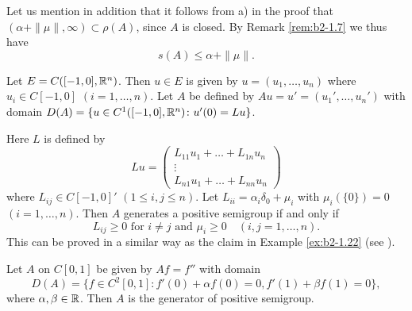 Let us mention in addition that it follows from a) in the proof that $(\alpha + \|\mu\|, \infty) \subset \rho(A)$, since $A$ is closed.
By Remark \ref{rem:b2-1.7} we thus have
\begin{equation}\label{eq:b2-1.14}
s(A) \leq \alpha + \|\mu\|.
\end{equation}
\begin{example}\label{ex:b2-1.23}
Let $E = C([-1,0],\mathbb{R}^{n})$.
Then $u \in E$ is given by $u = (u_{1},\ldots,u_{n})$ where $u_{i} \in C[-1,0]$ $(i=1,\ldots,n)$.
Let $A$ be defined by $Au = u' = (u_{1}',\ldots,u_{n}')$ with domain $D(A) = \{u \in C^{1}([-1,0],\mathbb{R}^{n}) \colon u'(0) = Lu\}$.

Here $L$ is defined by
\[
    Lu = \begin{pmatrix}
        L_{11}u_{1} + \ldots + L_{1n}u_{n} \\
        \vdots \\
        L_{n1}u_{1} + \ldots + L_{nn}u_{n}
    \end{pmatrix}
\]
where $L_{ij} \in C[-1,0]'$ $(1 \leq i,j \leq n)$.
Let $L_{ii} = \alpha_{i}\delta_{0} + \mu_{i}$ with $\mu_{i}(\{0\}) = 0$ $(i = 1,\ldots,n)$.
Then $A$ generates a positive semigroup if and only if 
\[
L_{ij} \geq 0 \text{ for } i \neq j \text{ and } \mu_{i} \geq 0 \quad (i,j = 1,\ldots,n) .
\]
This can be proved in a similar way as the claim in Example  \ref{ex:b2-1.22} 
(see \citet{arendt:1984a}).
\end{example}

\begin{example}\label{ex:b2-1.24}
Let $A$ on $C[0,1]$ be given by $Af = f''$ with domain 
\[
D(A) = \{f \in C^{2}[0,1] \colon f'(0) + \alpha f(0) = 0, f'(1) + \beta f(1) = 0\},
\]
where $\alpha,\beta \in \mathbb{R}$.
Then $A$ is the generator of positive semigroup.
\end{example}

